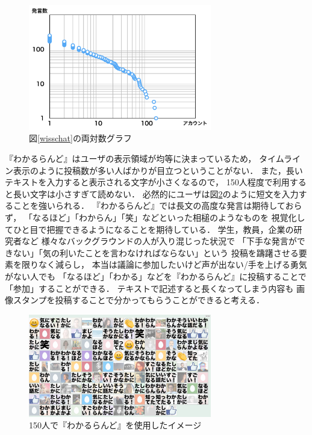 \begin{figure}[h]
\centering\includegraphics[width=8cm]{images/powerlaw.png}
\caption{図\ref{wisschat}の両対数グラフ}
\label{powerlaw}
\end{figure}

『わかるらんど』はユーザの表示領域が均等に決まっているため，
タイムライン表示のように投稿数が多い人ばかりが目立つということがない．
また，長いテキストを入力すると表示される文字が小さくなるので，
150人程度で利用すると長い文字は小さすぎて読めない．
必然的にユーザは図\ref{wakaruland150}のように短文を入力することを強いられる．
『わかるらんど』では長文の高度な発言は期待しておらず，
「なるほど」「わからん」「笑」などといった相槌のようなものを
視覚化してひと目で把握できるようになることを期待している．
学生，教員，企業の研究者など
様々なバックグラウンドの人が入り混じった状況で
「下手な発言ができない」「気の利いたことを言わなければならない」という
投稿を躊躇させる要素を限りなく減らし，
本当は議論に参加したいけど声が出ない/手を上げる勇気がない人でも
「なるほど」「わかる」などを『わかるらんど』に投稿することで「参加」することができる．
テキストで記述すると長くなってしまう内容も
画像スタンプを投稿することで分かってもらうことができると考える．


\begin{figure}[h]
\centering
\includegraphics[width=8cm]{images/wakaruland150.png}
\caption{150人で『わかるらんど』を使用したイメージ}
\label{wakaruland150}
\end{figure}

